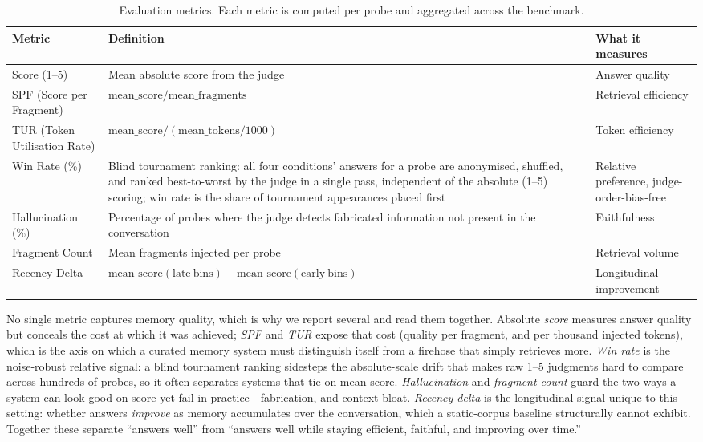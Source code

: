 \documentclass[10pt]{article}
\begin{document}
\begin{table}[htbp]
\centering
\small
\caption{Evaluation metrics. Each metric is computed per probe and aggregated across the benchmark.}
\label{tab:metrics}
\begin{tabular}{p{}p{}p{}}
\toprule
\textbf{Metric} & \textbf{Definition} & \textbf{What it measures} \\
\midrule
Score (1--5) & Mean absolute score from the judge & Answer quality \\
SPF (Score per Fragment) & $\mathrm{mean\_score} / \mathrm{mean\_fragments}$ & Retrieval efficiency \\
TUR (Token Utilisation Rate) & $\mathrm{mean\_score} / (\mathrm{mean\_tokens}/1000)$ & Token efficiency \\
Win Rate (\%) & Blind tournament ranking: all four conditions' answers for a probe are anonymised, shuffled, and ranked best-to-worst by the judge in a single pass, independent of the absolute (1--5) scoring; win rate is the share of tournament appearances placed first & Relative preference, judge-order-bias-free \\
Hallucination (\%) & Percentage of probes where the judge detects fabricated information not present in the conversation & Faithfulness \\
Fragment Count & Mean fragments injected per probe & Retrieval volume \\
Recency Delta & $\mathrm{mean\_score}(\mathrm{late\ bins}) - \mathrm{mean\_score}(\mathrm{early\ bins})$ & Longitudinal improvement \\
\bottomrule
\end{tabular}
\end{table}

No single metric captures memory quality, which is why we report several and read them together. Absolute \emph{score} measures answer quality but conceals the cost at which it was achieved; \emph{SPF} and \emph{TUR} expose that cost (quality per fragment, and per thousand injected tokens), which is the axis on which a curated memory system must distinguish itself from a firehose that simply retrieves more. \emph{Win rate} is the noise-robust relative signal: a blind tournament ranking sidesteps the absolute-scale drift that makes raw 1--5 judgments hard to compare across hundreds of probes, so it often separates systems that tie on mean score. \emph{Hallucination} and \emph{fragment count} guard the two ways a system can look good on score yet fail in practice---fabrication, and context bloat. \emph{Recency delta} is the longitudinal signal unique to this setting: whether answers \emph{improve} as memory accumulates over the conversation, which a static-corpus baseline structurally cannot exhibit. Together these separate ``answers well'' from ``answers well while staying efficient, faithful, and improving over time.''
\end{document}

